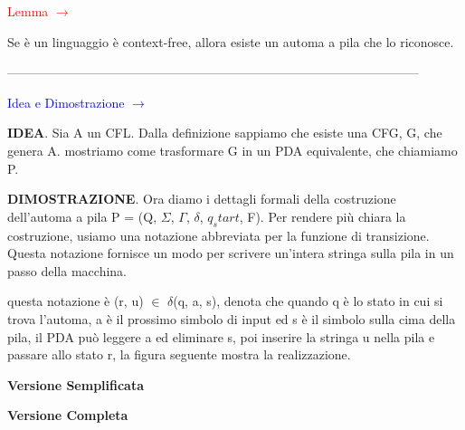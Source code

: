 \documentclass{article}
\begin{document}
\begin{center}
    \textcolor{red}{Lemma $\rightarrow$}
\end{center}

Se è un linguaggio è context-free, allora esiste un automa a pila che lo riconosce.

--------------------------------------------------------------------------------------------------

\textcolor{blue}{Idea e Dimostrazione $\rightarrow$}

\textbf{IDEA}. Sia A un CFL. Dalla definizione sappiamo che esiste una CFG, G, che genera A. mostriamo come trasformare G in un PDA equivalente, che chiamiamo P.

\textbf{DIMOSTRAZIONE}. Ora diamo i dettagli formali della costruzione \\dell'automa a pila P = (Q, $\Sigma$, $\Gamma$, $\delta$, $q_start$, F). Per rendere più chiara la costruzione, usiamo una notazione abbreviata per la funzione di transizione. Questa notazione fornisce un modo per scrivere un'intera stringa sulla pila in un passo della macchina.

questa notazione è (r, u) $\in$ $\delta$(q, a, s), denota che quando q è lo stato in cui si trova l'automa, a è il prossimo simbolo di input ed s è il simbolo sulla cima della pila, il PDA può leggere a ed eliminare s, poi inserire la stringa u nella pila e passare allo stato r, la figura seguente mostra la realizzazione.

\begin{center}
    \textbf{Versione Semplificata}

\end{center}

\begin{center}
    \textbf{Versione Completa}

\end{center}
\end{document}
